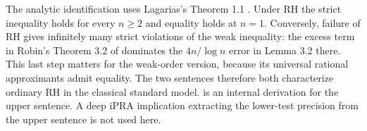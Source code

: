 The analytic identification uses Lagarias's Theorem 1.1 \cite{lagarias}. Under RH the strict inequality holds for every $n\ge2$ and equality holds at $n=1$. Conversely, failure of RH gives infinitely many strict violations of the weak inequality: the excess term in Robin's Theorem 3.2 of \cite{lagarias} dominates the $4n/\log n$ error in Lemma 3.2 there. This last step matters for the weak-order version, because its universal rational approximants admit equality. The two sentences therefore both characterize ordinary RH in the classical standard model.  is an internal derivation for the upper sentence. A deep iPRA implication extracting the lower-test precision from the upper sentence is not used here.
